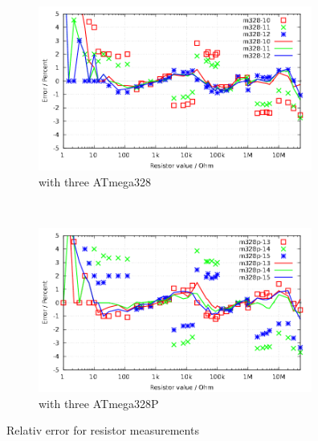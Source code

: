 \begin{figure}[H]
  \begin{subfigure}[b]{9cm}
    \centering
    \includegraphics[width=9cm]{../GNU/m328res_all.pdf}
    \caption{with three ATmega328}
    \label{fig:m328res_all}
  \end{subfigure}
  ~
  \begin{subfigure}[b]{9cm}
    \centering
    \includegraphics[width=9cm]{../GNU/m328pres_all.pdf}
    \caption{with three ATmega328P}
    \label{fig:m328pres_all}
  \end{subfigure}
\caption{Relativ error for resistor measurements}
\end{figure}

